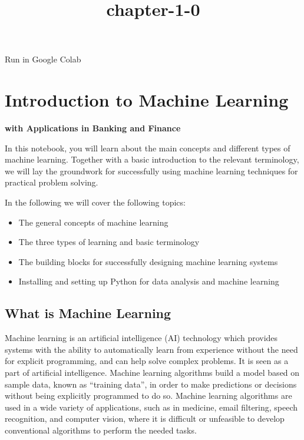 \documentclass[11pt]{article}
\title{chapter-1-0}
\providecommand{\tightlist}{%
      \setlength{\itemsep}{0pt}\setlength{\parskip}{0pt}}
\begin{document}
    
    \maketitle
    
    

    
    Run in Google Colab

    \hypertarget{introduction-to-machine-learning}{%
\section{Introduction to Machine
Learning}\label{introduction-to-machine-learning}}

\textbf{with Applications in Banking and Finance}

    In this notebook, you will learn about the main concepts and different
types of machine learning. Together with a basic introduction to the
relevant terminology, we will lay the groundwork for successfully using
machine learning techniques for practical problem solving.

In the following we will cover the following topics:

\begin{itemize}
\tightlist
\item
  The general concepts of machine learning
\item
  The three types of learning and basic terminology
\item
  The building blocks for successfully designing machine learning
  systems
\item
  Installing and setting up Python for data analysis and machine
  learning
\end{itemize}

    \hypertarget{what-is-machine-learning}{%
\subsection{What is Machine Learning}\label{what-is-machine-learning}}

Machine learning is an artificial intelligence (AI) technology which
provides systems with the ability to automatically learn from experience
without the need for explicit programming, and can help solve complex
problems. It is seen as a part of artificial intelligence. Machine
learning algorithms build a model based on sample data, known as
``training data'', in order to make predictions or decisions without
being explicitly programmed to do so. Machine learning algorithms are
used in a wide variety of applications, such as in medicine, email
filtering, speech recognition, and computer vision, where it is
difficult or unfeasible to develop conventional algorithms to perform
the needed tasks.
\end{document}
